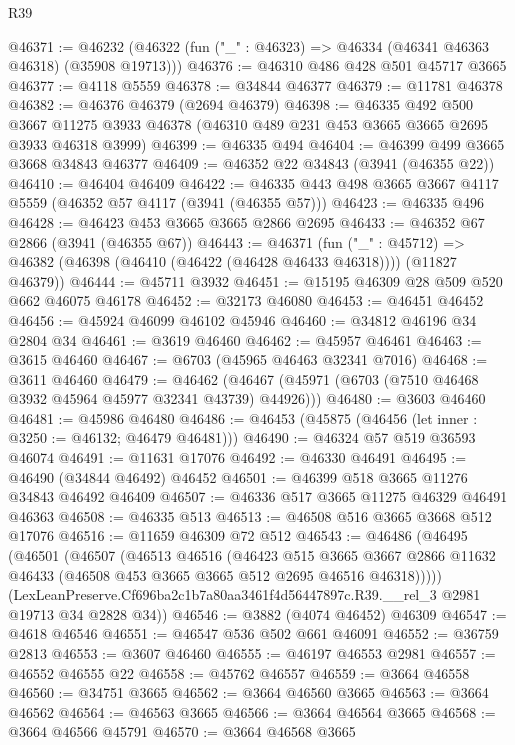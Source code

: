 \begin{lexlean}{R39}
\begin{coremodule}
@46371 := @46232 (@46322 (fun ("_" : @46323) => @46334 (@46341 @46363 @46318) (@35908 @19713)))
@46376 := @46310 @486 @428 @501 @45717 @3665
@46377 := @4118 @5559
@46378 := @34844 @46377
@46379 := @11781 @46378
@46382 := @46376 @46379 (@2694 @46379)
@46398 := @46335
    @492
    @500
    @3667
    @11275
    @3933
    @46378
    (@46310 @489 @231 @453 @3665 @3665 @2695 @3933 @46318 @3999)
@46399 := @46335 @494
@46404 := @46399 @499 @3665 @3668 @34843 @46377
@46409 := @46352 @22 @34843 (@3941 (@46355 @22))
@46410 := @46404 @46409
@46422 := @46335 @443 @498 @3665 @3667 @4117 @5559 (@46352 @57 @4117 (@3941 (@46355 @57)))
@46423 := @46335 @496
@46428 := @46423 @453 @3665 @3665 @2866 @2695
@46433 := @46352 @67 @2866 (@3941 (@46355 @67))
@46443 := @46371
    (fun ("_" : @45712) => @46382 (@46398 (@46410 (@46422 (@46428 @46433 @46318)))) (@11827 @46379))
@46444 := @45711 @3932
@46451 := @15195 @46309 @28 @509 @520 @662 @46075 @46178
@46452 := @32173 @46080
@46453 := @46451 @46452
@46456 := @45924 @46099 @46102 @45946
@46460 := @34812 @46196 @34 @2804 @34
@46461 := @3619 @46460
@46462 := @45957 @46461
@46463 := @3615 @46460
@46467 := @6703 (@45965 @46463 @32341 @7016)
@46468 := @3611 @46460
@46479 := @46462 (@46467 (@45971 (@6703 (@7510 @46468 @3932 @45964 @45977 @32341 @43739) @44926)))
@46480 := @3603 @46460
@46481 := @45986 @46480
@46486 := @46453 (@45875 (@46456 (let inner : @3250 := @46132; @46479 @46481)))
@46490 := @46324 @57 @519 @36593 @46074
@46491 := @11631 @17076
@46492 := @46330 @46491
@46495 := @46490 (@34844 @46492) @46452
@46501 := @46399 @518 @3665 @11276 @34843 @46492 @46409
@46507 := @46336 @517 @3665 @11275 @46329 @46491 @46363
@46508 := @46335 @513
@46513 := @46508 @516 @3665 @3668 @512 @17076
@46516 := @11659 @46309 @72 @512
@46543 := @46486
    (@46495
      (@46501
        (@46507
          (@46513
            @46516
            (@46423
              @515
              @3665
              @3667
              @2866
              @11632
              @46433
              (@46508 @453 @3665 @3665 @512 @2695 @46516 @46318)))))
      (LexLeanPreserve.Cf696ba2c1b7a80aa3461f4d56447897c.R39.__rel_3 @2981 @19713 @34 @2828 @34))
@46546 := @3882 (@4074 @46452) @46309
@46547 := @4618 @46546
@46551 := @46547 @536 @502 @661 @46091
@46552 := @36759 @2813
@46553 := @3607 @46460
@46555 := @46197 @46553 @2981
@46557 := @46552 @46555 @22
@46558 := @45762 @46557
@46559 := @3664 @46558
@46560 := @34751 @3665
@46562 := @3664 @46560 @3665
@46563 := @3664 @46562
@46564 := @46563 @3665
@46566 := @3664 @46564 @3665
@46568 := @3664 @46566 @45791
@46570 := @3664 @46568 @3665

\end{coremodule}
\end{lexlean}
